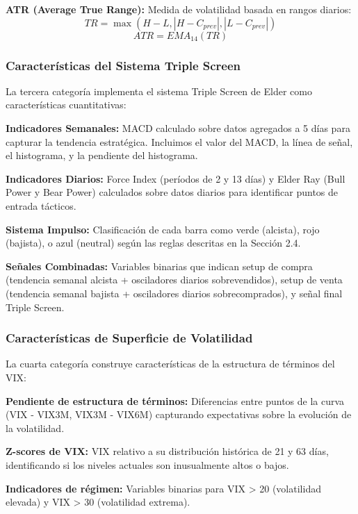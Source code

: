 \documentclass[11pt,a4paper]{article}
\begin{document}
\textbf{ATR (Average True Range):} Medida de volatilidad basada en rangos diarios:
\begin{equation}
TR = \max(H-L, |H-C_{prev}|, |L-C_{prev}|)
\end{equation}
\begin{equation}
ATR = EMA_{14}(TR)
\end{equation}

\subsubsection{Características del Sistema Triple Screen}

La tercera categoría implementa el sistema Triple Screen de Elder como características cuantitativas:

\textbf{Indicadores Semanales:} MACD calculado sobre datos agregados a 5 días para capturar la tendencia estratégica. Incluimos el valor del MACD, la línea de señal, el histograma, y la pendiente del histograma.

\textbf{Indicadores Diarios:} Force Index (períodos de 2 y 13 días) y Elder Ray (Bull Power y Bear Power) calculados sobre datos diarios para identificar puntos de entrada tácticos.

\textbf{Sistema Impulso:} Clasificación de cada barra como verde (alcista), rojo (bajista), o azul (neutral) según las reglas descritas en la Sección 2.4.

\textbf{Señales Combinadas:} Variables binarias que indican setup de compra (tendencia semanal alcista + osciladores diarios sobrevendidos), setup de venta (tendencia semanal bajista + osciladores diarios sobrecomprados), y señal final Triple Screen.

\subsubsection{Características de Superficie de Volatilidad}

La cuarta categoría construye características de la estructura de términos del VIX:

\textbf{Pendiente de estructura de términos:} Diferencias entre puntos de la curva (VIX - VIX3M, VIX3M - VIX6M) capturando expectativas sobre la evolución de la volatilidad.

\textbf{Z-scores de VIX:} VIX relativo a su distribución histórica de 21 y 63 días, identificando si los niveles actuales son inusualmente altos o bajos.

\textbf{Indicadores de régimen:} Variables binarias para VIX > 20 (volatilidad elevada) y VIX > 30 (volatilidad extrema).
\end{document}
